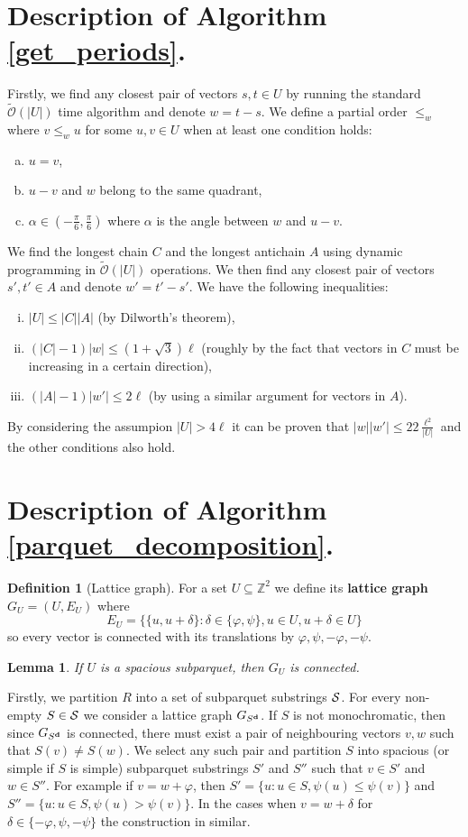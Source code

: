 \documentclass[11pt]{article}
\newcommand{\Z}{\mathbb{Z}}
\newcommand{\tO}{\tilde{\mathcal{O}}}
\renewcommand{\phi}{\varphi}
\newcommand{\set}[1]{\lbrace #1 \rbrace}
\newcommand{\bigset}[1]{\big \lbrace #1 \big \rbrace}
\theoremstyle{plain}
\newtheorem{lemma}{Lemma}
\theoremstyle{definition}
\newtheorem{definition}{Definition}
\begin{document}
\section{Description of Algorithm \ref{get_periods}.}
Firstly, we find any closest pair of vectors $s, t \in U$ by running the standard $\tO(|U|)$ time algorithm and denote $w = t - s$.
We define a partial order $\le_{w}$ where $v \le_w u$ for some $u, v \in U$ when at least one condition holds:
\begin{enumerate}[(a)]
	\item $u = v$,
	\item $u - v$ and $w$ belong to the same quadrant,
	\item $\alpha \in (-\frac{\pi}{6}, \frac{\pi}{6})$ where $\alpha$ is the angle between $w$ and $u - v$.
\end{enumerate}
We find the longest chain $C$ and the longest antichain $A$ using dynamic programming in $\tO(|U|)$ operations.
We then find any closest pair of vectors $s', t' \in A$ and denote $w' = t' - s'$.
We have the following inequalities:
\begin{enumerate}[(i)]
	\item $|U| \le |C| |A|$ (by Dilworth's theorem),
	\item $(|C| - 1) |w| \le (1 + \sqrt{3})\ell$ (roughly by the fact that vectors in $C$ must be increasing in a certain direction), 
	\item $(|A| - 1) |w'| \le 2 \ell$ (by using a similar argument for vectors in $A$).
\end{enumerate}
By considering the assumpion $|U| > 4\ell$ it can be proven that $|w||w'| \le 22 \frac{\ell^2}{|U|}$ and the other conditions also hold.


\section{Description of Algorithm \ref{parquet_decomposition}.}
\begin{definition}[Lattice graph]
	For a set $U \subseteq \Z^2$ we define its \textbf{lattice graph} $G_U = (U, E_U)$ where
	$$ E_U = \bigset{\set{u, u + \delta} : \delta \in \set{\phi, \psi}, u \in U, u + \delta \in U} $$ 
	so every vector is connected with its translations by $\phi, \psi, -\phi, -\psi$.
\end{definition}
\begin{lemma}
	If $U$ is a spacious subparquet, then $G_U$ is connected.
\end{lemma}
Firstly, we partition $R$ into a set of subparquet substrings $\S$.
For every non-empty $S \in \S$ we consider a lattice graph $G_{\d{S}}$. If $S$ is not monochromatic, then since $G_{\d{S}}$ is connected, there must exist a pair of neighbouring vectors $v, w$ such that $S(v) \neq S(w)$.
We select any such pair and partition $S$ into spacious (or simple if $S$ is simple) subparquet substrings $S'$ and $S''$ such that $v \in S'$ and $w \in S''$.
For example if $v = w + \phi$, then $S' = \set{u : u \in S, \psi(u) \le \psi(v)}$ and $S'' = \set{u : u \in S, \psi(u) > \psi(v)}$.
In the cases when $v = w + \delta$ for $\delta \in \set{-\phi, \psi, -\psi}$ the construction in similar.
\end{document}
